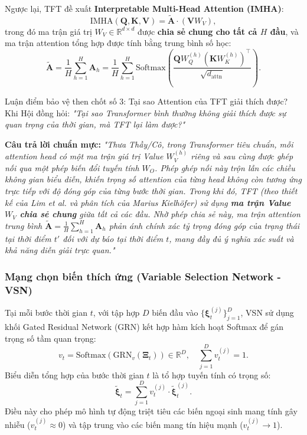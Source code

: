\documentclass[12pt,a4paper,oneside]{article}
\begin{document}
Ngược lại, TFT đề xuất \textbf{Interpretable Multi-Head Attention (IMHA)}:
\begin{equation}
    \text{IMHA}(\mathbf{Q}, \mathbf{K}, \mathbf{V}) = \tilde{\mathbf{A}} \cdot (\mathbf{V} W_V),
    \label{eq:interpretable_mha}
\end{equation}
trong đó ma trận giá trị $W_V \in \mathbb{R}^{d \times d}$ được \textbf{chia sẻ chung cho tất cả $H$ đầu}, và ma trận attention tổng hợp được tính bằng trung bình số học:
\begin{equation}
    \tilde{\mathbf{A}} = \frac{1}{H} \sum_{h=1}^H \mathbf{A}_h = \frac{1}{H} \sum_{h=1}^H \text{Softmax}\!\left(\frac{\mathbf{Q}W_Q^{(h)} (\mathbf{K}W_K^{(h)})^\top}{\sqrt{d_{\text{attn}}}}\right).
    \label{eq:avg_attention_matrix}
\end{equation}

\begin{defensebox}{Luận điểm bảo vệ then chốt số 3: Tại sao Attention của TFT giải thích được?}
    Khi Hội đồng hỏi: \textit{"Tại sao Transformer bình thường không giải thích được sự quan trọng của thời gian, mà TFT lại làm được?"}
    
    \textbf{Câu trả lời chuẩn mực:}
    \textit{"Thưa Thầy/Cô, trong Transformer tiêu chuẩn, mỗi attention head có một ma trận giá trị Value $W_V^{(h)}$ riêng và sau cùng được ghép nối qua một phép biến đổi tuyến tính $W_O$. Phép ghép nối này trộn lẫn các chiều không gian biểu diễn, khiến trọng số attention của từng head không còn tương ứng trực tiếp với độ đóng góp của từng bước thời gian. 
    Trong khi đó, TFT (theo thiết kế của Lim et al. và phân tích của Marius Kielh\"{o}fer) sử dụng \textbf{ma trận Value $W_V$ chia sẻ chung} giữa tất cả các đầu. Nhờ phép chia sẻ này, ma trận attention trung bình $\tilde{\mathbf{A}} = \frac{1}{H}\sum_{h=1}^H \mathbf{A}_h$ phản ánh chính xác tỷ trọng đóng góp của trạng thái tại thời điểm $t'$ đối với dự báo tại thời điểm $t$, mang đầy đủ ý nghĩa xác suất và khả năng diễn giải trực quan."}
\end{defensebox}

\subsubsection{Mạng chọn biến thích ứng (Variable Selection Network - VSN)}

Tại mỗi bước thời gian $t$, với tập hợp $D$ biến đầu vào $\{\bm{\xi}_t^{(j)}\}_{j=1}^D$, VSN sử dụng khối Gated Residual Network (GRN) kết hợp hàm kích hoạt Softmax để gán trọng số tầm quan trọng:
\begin{equation}
    v_t = \text{Softmax}\left( \text{GRN}_{v}\left( \bm{\Xi}_t \right) \right) \in \mathbb{R}^D, \quad \sum_{j=1}^D v_t^{(j)} = 1.
    \label{eq:vsn_weights}
\end{equation}
Biểu diễn tổng hợp của bước thời gian $t$ là tổ hợp tuyến tính có trọng số:
\begin{equation}
    \tilde{\bm{\xi}}_t = \sum_{j=1}^D v_t^{(j)} \cdot \tilde{\bm{\xi}}_t^{(j)}.
    \label{eq:vsn_aggregation}
\end{equation}
Điều này cho phép mô hình tự động triệt tiêu các biến ngoại sinh mang tính gây nhiễu ($v_t^{(j)} \approx 0$) và tập trung vào các biến mang tín hiệu mạnh ($v_t^{(j)} \rightarrow 1$).
\end{document}

